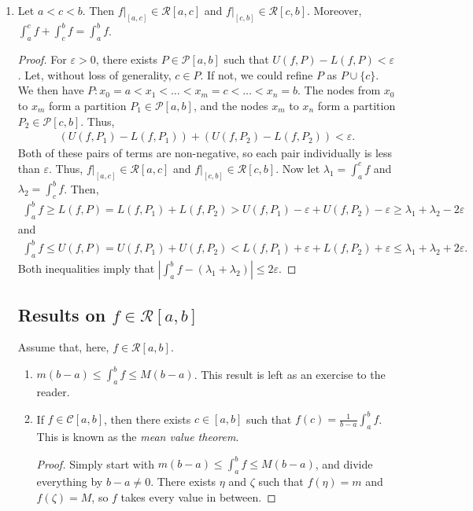 \documentclass[15pt,a4paper]{book}
\theoremstyle{definition}
\newcommand{\eax}[1]{\emph{#1}\index{#1}} %
\newcommand{\abs}[1]{\left| #1 \right|} %
\newcommand{\cP}{\mathcal{P}}
\newcommand{\cR}{\mathcal{R}}
\newcommand{\cC}{\mathcal{C}}
\begin{document}
\begin{enumerate}
\item Let $a < c < b$. Then $f|_{[a,c]} \in \cR[a,c]$ and $f|_{[c,b]} \in \cR[c,b]$. Moreover, $\int_{a}^{c} f + \int_{c}^{b} f = \int_{a}^{b} f$.

\begin{proof}
    For $\varepsilon > 0$, there exists $P \in \cP[a,b]$ such that $U(f,P) - L(f,P) < \varepsilon$. Let, without loss of generality, $c \in P$. If not, we could refine $P$ as $P \cup \{c\}$. We then have $P: x_{0} = a < x_{1} < \ldots < x_{m} = c < \ldots < x_{n} = b$. The nodes from $x_{0}$ to $x_{m}$ form a partition $P_{1} \in \cP[a,b]$, and the nodes $x_{m}$ to $x_{n}$ form a partition $P_{2} \in \cP[c,b]$. Thus,
    \begin{align}
        (U(f,P_{1})-L(f,P_{1})) + (U(f,P_{2})-L(f,P_{2})) < \varepsilon.
    \end{align}
    Both of these pairs of terms are non-negative, so each pair individually is less than $\varepsilon$. Thus, $f|_{[a,c]} \in \cR[a,c]$ and $f|_{[c,b]} \in \cR[c,b]$. Now let $\lambda_{1} = \int_{a}^{c} f$ and $\lambda_{2} = \int_{c}^{b} f$. Then,
    \begin{align}
        \int_{a}^{b} f \geq L(f,P) = L(f,P_{1}) + L(f,P_{2}) > U(f,P_{1}) - \varepsilon + U(f,P_{2}) - \varepsilon \geq \lambda_{1} + \lambda_{2} - 2\varepsilon
    \end{align}
    and
    \begin{align}
        \int_{a}^{b} f \leq U(f,P) = U(f,P_{1}) + U(f,P_{2}) < L(f,P_{1}) + \varepsilon + L(f,P_{2}) + \varepsilon \leq \lambda_{1} + \lambda_{2} + 2\varepsilon.
    \end{align}
    Both inequalities imply that $\abs{\int_{a}^{b} f - (\lambda_{1}+\lambda_{2})} \leq 2\varepsilon$.
\end{proof}
\subsection{Results on $f \in \cR[a,b]$}
Assume that, here, $f \in \cR[a,b]$.
\begin{enumerate}
    \item $m(b-a) \leq \int_{a}^{b} f \leq M(b-a)$. This result is left as an exercise to the reader.
    \item If $f \in \cC[a,b]$, then there exists $c \in [a,b]$ such that $f(c) = \frac{1}{b-a} \int_{a}^{b} f$. This is known as the \eax{mean value theorem}.
    \begin{proof}
        Simply start with $m(b-a) \leq \int_{a}^{b} f \leq M(b-a)$, and divide everything by $b-a \neq 0$. There exists $\eta$ and $\zeta$ such that $f(\eta) = m$ and $f(\zeta) = M$, so $f$ takes every value in between.
    \end{proof}
\end{enumerate}


\end{enumerate}
\end{document}
